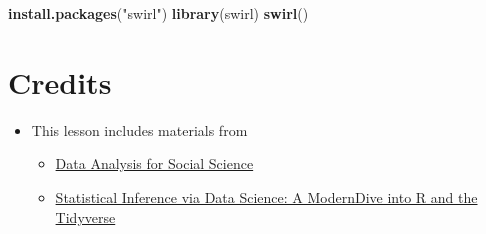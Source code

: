 \documentclass[
]{book}
\newenvironment{Shaded}{\begin{snugshade}}{\end{snugshade}}
\newcommand{\FunctionTok}[1]{\textcolor[rgb]{0.13,0.29,0.53}{\textbf{#1}}}
\newcommand{\NormalTok}[1]{#1}
\newcommand{\StringTok}[1]{\textcolor[rgb]{0.31,0.60,0.02}{#1}}
\providecommand{\tightlist}{%
  \setlength{\itemsep}{0pt}\setlength{\parskip}{0pt}}
\begin{document}
\begin{Shaded}
\begin{Highlighting}[]
\FunctionTok{install.packages}\NormalTok{(}\StringTok{"swirl"}\NormalTok{)}
\FunctionTok{library}\NormalTok{(swirl)}
\FunctionTok{swirl}\NormalTok{()}
\end{Highlighting}
\end{Shaded}

\section{Credits}\label{credits}

\begin{itemize}
\tightlist
\item
  This lesson includes materials from

  \begin{itemize}
  \tightlist
  \item
    \href{https://scholar.harvard.edu/ellaudet/DSS}{Data Analysis for Social Science}
  \item
    \href{https://moderndive.com/index.html}{Statistical Inference via Data Science: A ModernDive into R and the Tidyverse}
  \end{itemize}
\end{itemize}

  
\end{document}
